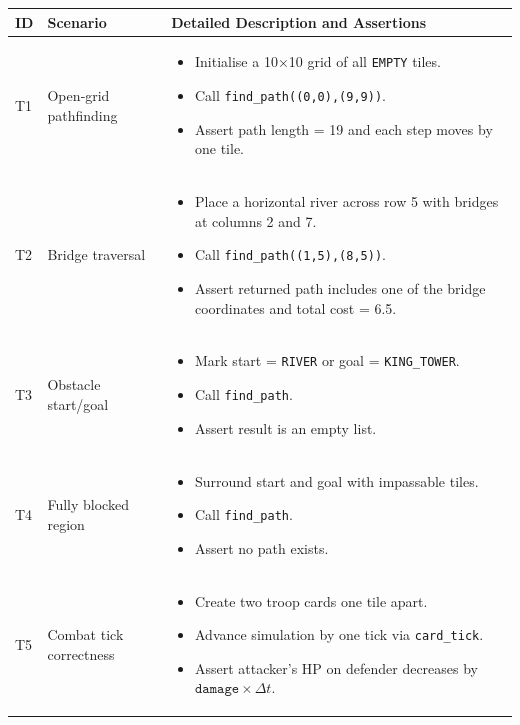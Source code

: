 \documentclass[11pt,a4paper]{article}
\begin{document}
\begin{longtable}{p{1cm} p{4.5cm} p{4.5cm}}
\toprule
\textbf{ID} & \textbf{Scenario} & \textbf{Detailed Description and Assertions} \\ \midrule
T1 & Open‐grid pathfinding &  
\begin{itemize}[nosep]  
  \item Initialise a 10×10 grid of all \texttt{EMPTY} tiles.  
  \item Call \texttt{find\_path((0,0),(9,9))}.  
  \item Assert path length = 19 and each step moves by one tile.  
\end{itemize} \\[1ex] 
\hline
T2 & Bridge traversal &  
\begin{itemize}[nosep]
  \item Place a horizontal river across row 5 with bridges at columns 2 and 7.  
  \item Call \texttt{find\_path((1,5),(8,5))}.  
  \item Assert returned path includes one of the bridge coordinates and total cost = 6.5.  
\end{itemize} \\[1ex] 
\hline
T3 & Obstacle start/goal &  
\begin{itemize}[nosep]
  \item Mark start = \texttt{RIVER} or goal = \texttt{KING\_TOWER}.  
  \item Call \texttt{find\_path}.  
  \item Assert result is an empty list.  
\end{itemize} \\[1ex]
\hline
T4 & Fully blocked region &  
\begin{itemize}[nosep]
  \item Surround start and goal with impassable tiles.  
  \item Call \texttt{find\_path}.  
  \item Assert no path exists.  
\end{itemize} \\[1ex]
\hline
T5 & Combat tick correctness &  
\begin{itemize}[nosep]
  \item Create two troop cards one tile apart.  
  \item Advance simulation by one tick via \texttt{card\_tick}.  
  \item Assert attacker’s HP on defender decreases by \(\texttt{damage}\times\Delta t\).  

\end{itemize}
\end{longtable}
\end{document}
